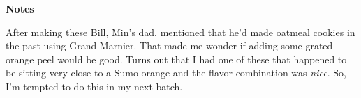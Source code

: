 \documentclass{article}
\begin{document}
\bigskip

\textbf{Notes}

After making these Bill, Min's dad, mentioned that he'd made oatmeal cookies in the past using
Grand Marnier. That made me wonder if adding some grated orange peel would be good. Turns out that
I had one of these that happened to be sitting very close to a Sumo orange and the flavor
combination was \emph{nice}. So, I'm tempted to do this in my next batch.

\end{document}
